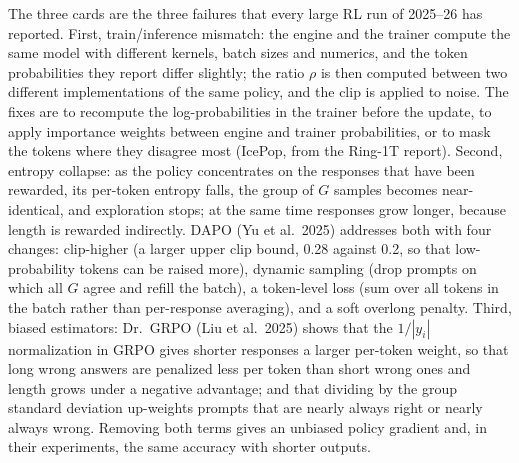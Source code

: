 \documentclass[11pt,letterpaper]{article}
\begin{document}
The three cards are the three failures that every large RL run of 2025--26 has reported. First, train/inference mismatch: the engine and the trainer compute the same model with different kernels, batch sizes and numerics, and the token probabilities they report differ slightly; the ratio $\rho$ is then computed between two different implementations of the same policy, and the clip is applied to noise. The fixes are to recompute the log-probabilities in the trainer before the update, to apply importance weights between engine and trainer probabilities, or to mask the tokens where they disagree most (IcePop, from the Ring-1T report). Second, entropy collapse: as the policy concentrates on the responses that have been rewarded, its per-token entropy falls, the group of $G$ samples becomes near-identical, and exploration stops; at the same time responses grow longer, because length is rewarded indirectly. DAPO (Yu et al.\ 2025) addresses both with four changes: clip-higher (a larger upper clip bound, 0.28 against 0.2, so that low-probability tokens can be raised more), dynamic sampling (drop prompts on which all $G$ agree and refill the batch), a token-level loss (sum over all tokens in the batch rather than per-response averaging), and a soft overlong penalty. Third, biased estimators: Dr.\ GRPO (Liu et al.\ 2025) shows that the $1/|y_i|$ normalization in GRPO gives shorter responses a larger per-token weight, so that long wrong answers are penalized less per token than short wrong ones and length grows under a negative advantage; and that dividing by the group standard deviation up-weights prompts that are nearly always right or nearly always wrong. Removing both terms gives an unbiased policy gradient and, in their experiments, the same accuracy with shorter outputs.
\end{document}
